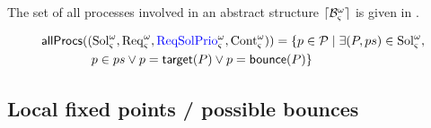 
The set of all processes involved in an abstract structure $\cwB$ is given in .
\begin{definition}
\label{def:allprocs}
  \begin{align*}
  &\allprocs((\cwSol,\cwReq,\cwRSP,\cwCont)) = \{ p \in \PHproc \mid \exists (P,ps) \in \cwSol, \\
    &\qquad\qquad p \in ps \vee p = \PHtarget(P) \vee p = \PHbounce(P) \} \\
  \end{align*}
\end{definition}

\subsection{Local fixed points / possible bounces}


